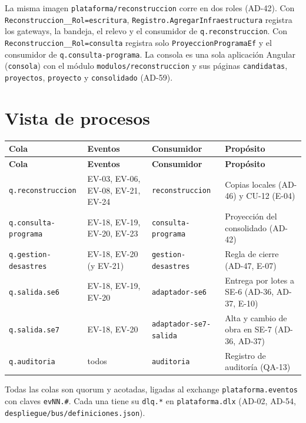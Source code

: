 \documentclass[11pt,a4paper]{article}
\begin{document}
La misma imagen \texttt{plataforma/reconstruccion} corre en dos roles (AD-42). Con
\texttt{Reconstruccion\_\_Rol=escritura}, \texttt{Registro.AgregarInfraestructura} registra los gateways, la bandeja,
el relevo y el consumidor de \texttt{q.reconstruccion}. Con \texttt{Reconstruccion\_\_Rol=consulta} registra solo
\texttt{ProyeccionProgramaEf} y el consumidor de \texttt{q.consulta-programa}. La consola es una sola aplicación
Angular (\texttt{consola}) con el módulo \texttt{modulos/reconstruccion} y sus páginas \texttt{candidatas},
\texttt{proyectos}, \texttt{proyecto} y \texttt{consolidado} (AD-59).

\section{Vista de procesos}
\label{sec:procesos}

{\small
\begin{longtable}{|P{3.4cm}|P{3.6cm}|P{3.6cm}|P{4.0cm}|}
  \hline
  \textbf{Cola} & \textbf{Eventos} & \textbf{Consumidor} & \textbf{Propósito} \\ \hline
  \endfirsthead
  \hline
  \textbf{Cola} & \textbf{Eventos} & \textbf{Consumidor} & \textbf{Propósito} \\ \hline
  \endhead
  \texttt{q.reconstruccion} & EV-03, EV-06, EV-08, EV-21, EV-24 & \texttt{reconstruccion} & Copias locales (AD-46)
    y CU-12 (E-04) \\ \hline
  \texttt{q.consulta-programa} & EV-18, EV-19, EV-20, EV-23 & \texttt{consulta-programa} & Proyección del
    consolidado (AD-42) \\ \hline
  \texttt{q.gestion-desastres} & EV-18, EV-20 (y EV-21) & \texttt{gestion-desastres} & Regla de cierre (AD-47,
    E-07) \\ \hline
  \texttt{q.salida.se6} & EV-18, EV-19, EV-20 & \texttt{adaptador-se6} & Entrega por lotes a SE-6 (AD-36, AD-37,
    E-10) \\ \hline
  \texttt{q.salida.se7} & EV-18, EV-20 & \texttt{adaptador-se7-salida} & Alta y cambio de obra en SE-7 (AD-36,
    AD-37) \\ \hline
  \texttt{q.auditoria} & todos & \texttt{auditoria} & Registro de auditoría (QA-13) \\ \hline
\end{longtable}
}

Todas las colas son quorum y acotadas, ligadas al exchange \texttt{plataforma.eventos} con claves
\texttt{evNN.\#}. Cada una tiene su \texttt{dlq.*} en \texttt{plataforma.dlx} (AD-02, AD-54,
\texttt{despliegue/bus/definiciones.json}).
\end{document}
